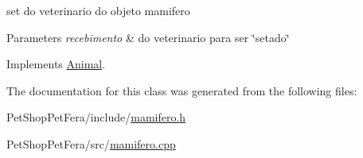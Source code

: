 set do veterinario do objeto mamifero 


\begin{DoxyParams}{Parameters}
{\em recebimento} & do veterinario para ser \char`\"{}setado\char`\"{} \\
\hline
\end{DoxyParams}


Implements \mbox{\hyperlink{class_animal}{Animal}}.



The documentation for this class was generated from the following files\+:\begin{DoxyCompactItemize}
\item 
Pet\+Shop\+Pet\+Fera/include/\mbox{\hyperlink{mamifero_8h}{mamifero.\+h}}\item 
Pet\+Shop\+Pet\+Fera/src/\mbox{\hyperlink{mamifero_8cpp}{mamifero.\+cpp}}\end{DoxyCompactItemize}

